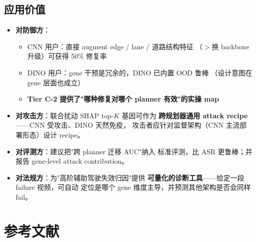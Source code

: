 \documentclass[a4paper,12pt,fontset=fandol]{ctexart}
\begin{document}
{\subsection{应用价值}

\begin{itemize}
\item \textbf{对防御方}：
  \begin{itemize}
  \item CNN 用户：直接 augment edge / lane / 道路结构特征
        （$>$换 backbone 升级）可获得 50\% 修复率
  \item DINO 用户：gene 干预是冗余的，DINO 已内置 OOD 鲁棒
        （设计意图在 gene 层面也成立）
  \item \textbf{Tier C-2 提供了"哪种修复对哪个 planner 有效"的实操 map}
  \end{itemize}
\item \textbf{对攻击方}：联合扰动 SHAP top-$K$ 基因可作为
      \textbf{跨规划器通用 attack recipe}——CNN 受攻击、DINO 天然免疫，
      攻击者应针对监督架构（CNN 主流部署形态）设计 recipe。
\item \textbf{对评测方}：建议把"跨 planner 迁移 AUC"纳入
      标准评测，比 ASR 更鲁棒；并报告 gene-level attack contribution。
\item \textbf{对法规方}：为"高阶辅助驾驶失效归因"提供
      \textbf{可量化的诊断工具}——给定一段 failure 视频，可自动
      定位是哪个 gene 维度主导，并预测其他架构是否会同样 fail。
\end{itemize}

\newpage
\section*{参考文献}
\small

}
\end{document}
